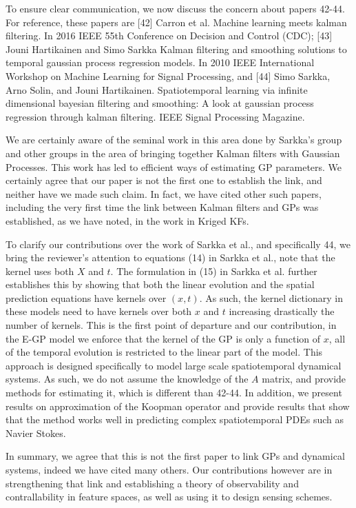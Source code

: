 \documentclass{letter}
\begin{document}
To ensure clear communication, we now discuss the concern about papers 42-44. For reference, these papers are  [42] Carron et al. 
Machine learning meets kalman filtering. In 2016 IEEE 55th Conference on Decision and
Control (CDC); [43] Jouni Hartikainen and Simo Sarkka Kalman filtering and smoothing solutions to temporal
gaussian process regression models. In 2010 IEEE International Workshop on Machine
Learning for Signal Processing, and 
[44] Simo Sarkka, Arno Solin, and Jouni Hartikainen. Spatiotemporal learning via infinite dimensional bayesian filtering and smoothing: A look at gaussian process regression through kalman filtering. IEEE Signal Processing Magazine.

 We are certainly aware of the seminal work in this area done by Sarkka's group and other groups in the area of bringing together Kalman filters with Gaussian Processes. This work has led to efficient ways of estimating GP parameters. We certainly agree that our paper is not the first one to establish the link, and neither have we made such claim. In fact, we have cited other such papers, including the very first time the link between Kalman filters and GPs was established, as we have noted, in the work in Kriged KFs.  

To clarify our contributions over  the work of Sarkka et al., and specifically 44, we bring the reviewer's attention to equations (14) in Sarkka et al., note that the kernel uses both $X$ and $t$. The formulation in (15) in Sarkka et al. further establishes this by showing that both the linear evolution and the spatial prediction equations have kernels over $(x,t)$. As such, the kernel dictionary in these models need to have kernels over both $x$ and $t$ increasing drastically the number of kernels. This is the first point of departure and our contribution, in the E-GP model we enforce that the kernel of the GP is only a function of $x$, all of the temporal evolution is restricted to the linear part of the model. This approach is designed specifically to model large scale spatiotemporal dynamical systems. As such, we do not assume the knowledge of the $A$ matrix, and provide methods for estimating it, which is different than 42-44. In addition, we present results on approximation of the Koopman operator and provide results that show that the method works well in predicting complex spatiotemporal PDEs such as Navier Stokes.

In summary, we agree that this is not the first paper to link GPs and dynamical systems, indeed we have cited many others. Our contributions however are in strengthening that link and establishing a theory of observability and contrallability in feature spaces, as well as using it to design sensing schemes.
\end{document}
